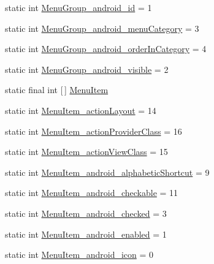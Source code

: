 \begin{DoxyCompactItemize}
static int \hyperlink{classandroid_1_1support_1_1design_1_1R_1_1styleable_a432ced7a651f227099d551787caa5dc8}{Menu\+Group\+\_\+android\+\_\+id} = 1
\item 
static int \hyperlink{classandroid_1_1support_1_1design_1_1R_1_1styleable_af2447533946253a30d30554961e4a70c}{Menu\+Group\+\_\+android\+\_\+menu\+Category} = 3
\item 
static int \hyperlink{classandroid_1_1support_1_1design_1_1R_1_1styleable_a9674d65ecf8bf01ec0a3ad6740fd1642}{Menu\+Group\+\_\+android\+\_\+order\+In\+Category} = 4
\item 
static int \hyperlink{classandroid_1_1support_1_1design_1_1R_1_1styleable_a62b922817ddc433833e29afbd90027aa}{Menu\+Group\+\_\+android\+\_\+visible} = 2
\item 
static final int \mbox{[}$\,$\mbox{]} \hyperlink{classandroid_1_1support_1_1design_1_1R_1_1styleable_a4c90afdbb461f2bfba191da26fbc881c}{Menu\+Item}
\item 
static int \hyperlink{classandroid_1_1support_1_1design_1_1R_1_1styleable_ac3b8f7bd30f9bc1ac057760201dfb65d}{Menu\+Item\+\_\+action\+Layout} = 14
\item 
static int \hyperlink{classandroid_1_1support_1_1design_1_1R_1_1styleable_a456f32170b14cb7530deba3660c427af}{Menu\+Item\+\_\+action\+Provider\+Class} = 16
\item 
static int \hyperlink{classandroid_1_1support_1_1design_1_1R_1_1styleable_a0cb751f455c5645ceca6fe5635e01f69}{Menu\+Item\+\_\+action\+View\+Class} = 15
\item 
static int \hyperlink{classandroid_1_1support_1_1design_1_1R_1_1styleable_a1086898c8f2f36e911f6252adae34a8b}{Menu\+Item\+\_\+android\+\_\+alphabetic\+Shortcut} = 9
\item 
static int \hyperlink{classandroid_1_1support_1_1design_1_1R_1_1styleable_ae1065c880977606a130948ccb5422e36}{Menu\+Item\+\_\+android\+\_\+checkable} = 11
\item 
static int \hyperlink{classandroid_1_1support_1_1design_1_1R_1_1styleable_a6ae0844cc817de9df364dfc0a857a864}{Menu\+Item\+\_\+android\+\_\+checked} = 3
\item 
static int \hyperlink{classandroid_1_1support_1_1design_1_1R_1_1styleable_a209d7c1542d115aa9a96d72d2ac3e24b}{Menu\+Item\+\_\+android\+\_\+enabled} = 1
\item 
static int \hyperlink{classandroid_1_1support_1_1design_1_1R_1_1styleable_aad27da563931a43a215291fed76d8fc1}{Menu\+Item\+\_\+android\+\_\+icon} = 0
\item 

\end{DoxyCompactItemize}
